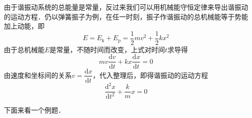 

由于谐振动系统的总能量是常量，反过来我们可以用机械能守恒定律来导出谐振动的运动方程．仍以弹簧振子为例，在任一时刻，振子作谐振动的总机械能等于势能加上动能，即
\begin{equation}
E=E_{\mathrm k}+E_{\mathrm p}=\frac{1}{2} m v^{2}+\frac{1}{2} k x^{2}
\end{equation}
由于总机械能$E$是常量，不随时间而改变，上式对时间$t$求导得
\begin{equation}
m v \frac{\mathrm{d} v}{\mathrm{d} t}+k x \frac{\mathrm{d} x}{\mathrm{d} t}=0
\end{equation}
由速度和坐标间的关系$v = \dfrac{\mathrm d x}{\mathrm dt}$，代入整理后，即得谐振动的运动方程
\begin{equation}
\frac{\mathrm{d}^{2} x}{\mathrm{d} t^{2}}+\frac{k}{m} x=0
\end{equation}

下面来看一个例题．

